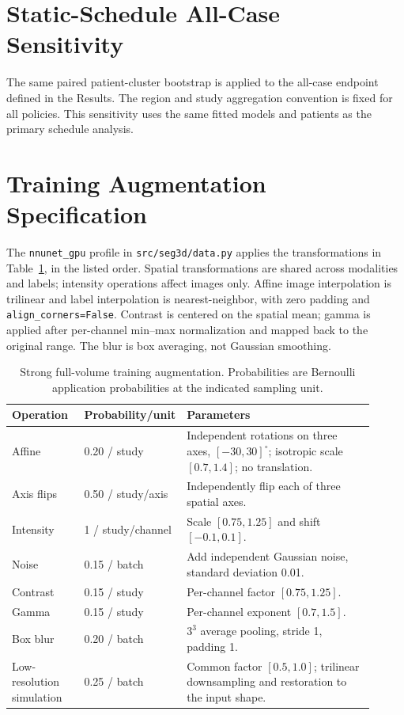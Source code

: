 \documentclass[mathematics,article,submit,pdftex,moreauthors]{Definitions/mdpi}
\begin{document}
\section{Static-Schedule All-Case Sensitivity}\label{app:fp}
The same paired patient-cluster bootstrap is applied to the all-case endpoint
defined in the Results. The region and study aggregation convention is fixed
for all policies. This sensitivity uses the same fitted models and patients
as the primary schedule analysis.
\begin{table}[H]
\caption{All-case static schedule contrasts, including absent regions.}
\centering\small
\end{table}
\section{Training Augmentation Specification}\label{app:augment}
The \texttt{nnunet\_gpu} profile in \texttt{src/seg3d/data.py} applies
the transformations in Table~\ref{tab:augment}, in the listed order.
Spatial transformations are shared across modalities and labels; intensity
operations affect images only. Affine image interpolation is trilinear and
label interpolation is nearest-neighbor, with zero padding and
\texttt{align\_corners=False}. Contrast is centered on the spatial mean;
gamma is applied after per-channel min--max normalization and mapped back
to the original range. The blur is box averaging, not Gaussian smoothing.
\begin{table}[H]
\caption{Strong full-volume training augmentation. Probabilities are
Bernoulli application probabilities at the indicated sampling unit.}
\label{tab:augment}
\centering\small
\setlength{\tabcolsep}{2pt}
\begin{tabular}{p{0.20\linewidth}p{0.18\linewidth}p{0.53\linewidth}}
\toprule Operation & Probability/unit & Parameters \\
\midrule
Affine & 0.20 / study & Independent rotations on three axes,
$[-30,30]^\circ$; isotropic scale $[0.7,1.4]$; no translation. \\
Axis flips & 0.50 / study/axis & Independently flip each of three spatial axes. \\
Intensity & 1 / study/channel & Scale $[0.75,1.25]$ and shift $[-0.1,0.1]$. \\
Noise & 0.15 / batch & Add independent Gaussian noise, standard deviation 0.01. \\
Contrast & 0.15 / study & Per-channel factor $[0.75,1.25]$. \\
Gamma & 0.15 / study & Per-channel exponent $[0.7,1.5]$. \\
Box blur & 0.20 / batch & $3^3$ average pooling, stride 1, padding 1. \\
Low-resolution simulation & 0.25 / batch & Common factor $[0.5,1.0]$;
trilinear downsampling and restoration to the input shape. \\
\bottomrule
\end{tabular}
\end{table}
\end{document}
